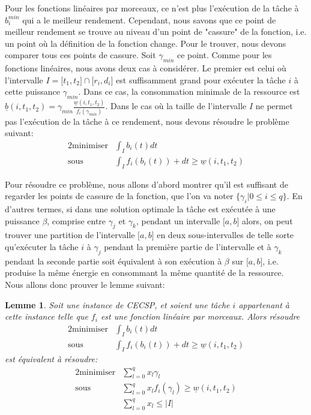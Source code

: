 \documentclass{report}
\newcommand{\bb}{\underline{b}(i,t_1,t_2)}
\newcommand{\wb}{\underline{w}(i,t_1,t_2)}
\newtheorem{Lem}{Lemme}
\begin{document}
Pour les fonctions linéaires par morceaux, ce n'est plus l'exécution de la tâche à $b_i^{min}$ qui a le meilleur rendement. Cependant, nous savons que ce point de meilleur rendement se trouve au niveau d'un point de "cassure" de la fonction, i.e. un point où la définition de la fonction change. Pour le trouver, nous devons comparer tous ces points de cassure. Soit $\gamma_{min}$ ce point. Comme pour les fonctions linéaires, nous avons deux cas à considérer. Le premier est celui où l'intervalle $I={[}t_1,t_2{]}\cap {[}r_i,d_i{]}$ est suffisamment grand pour exécuter la tâche $i$ à cette puissance $\gamma_{min}$. Dans ce cas, la consommation minimale de la ressource est $\bb= \gamma_{min} \frac{\wb}{f_i(\gamma_{min})}$. Dans le cas où la taille de l'intervalle $I$ ne permet pas l'exécution de la tâche à ce rendement, nous devons résoudre le problème suivant: 
\begin{alignat*}{2}
  \text{minimiser}   & \int_{I} b_i(t)dt  \\
  \text{sous} & \int_{I} f_i(b_i(t))+dt \ge \wb
\end{alignat*}
		
Pour résoudre ce problème, nous allons d'abord montrer qu'il est suffisant de regarder les points de cassure de la fonction, que l'on va noter $\{\gamma_i | 0 \le i\le q\}$. En d'autres termes, si dans une solution optimale la tâche est exécutée à une puissance $\beta$, comprise entre $\gamma_j$ et $\gamma_k$, pendant un intervalle ${[}a,b{]}$ alors, on peut trouver une partition de l'intervalle ${[}a,b{]}$ en deux sous-intervalles de telle sorte qu'exécuter la tâche $i$ à $\gamma_j$ pendant la première partie de l'intervalle et à $\gamma_k$ pendant la seconde partie soit équivalent à son exécution à $\beta$ sur ${[}a,b{]}$, i.e. produise la même énergie en consommant la même quantité de la ressource.\\
Nous allons donc prouver le lemme suivant:

\begin{Lem}
  Soit une instance de CECSP, et soient une tâche $i$ appartenant à cette instance telle que $f_i$ est une fonction linéaire par morceaux. Alors résoudre
  \begin{alignat*}{2}
    \text{minimiser}   & \int_{I} b_i(t)dt  \\
    \text{sous} & \int_{I} f_i(b_i(t))+dt \ge \wb
  \end{alignat*}
  est équivalent à résoudre:
  \begin{alignat*}{2}
    \text{minimiser}   & \sum\limits_{l=0}^q x_l\gamma_l \\
    \text{sous} & \sum\limits_{l=0}^q x_lf_i(\gamma_l) \ge \wb \\
    & \sum\limits_{l=0}^q x_l \le |I|
  \end{alignat*}
\end{Lem}
\end{document}
